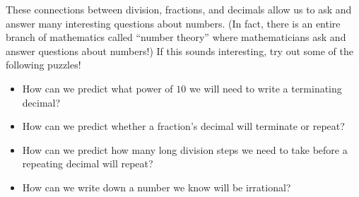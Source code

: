 \documentclass{ximera}
\begin{document}
These connections between division, fractions, and decimals allow us to ask and answer many interesting questions about numbers. (In fact, there is an entire branch of mathematics called ``number theory'' where mathematicians ask and answer questions about numbers!) If this sounds interesting, try out some of the following puzzles!

\begin{itemize}
	\item How can we predict what power of $10$ we will need to write a terminating decimal?
	\item How can we predict whether a fraction's decimal will terminate or repeat?
	\item How can we predict how many long division steps we need to take before a repeating decimal will repeat?
	\item How can we write down a number we know will be irrational?
\end{itemize}
\end{document}
